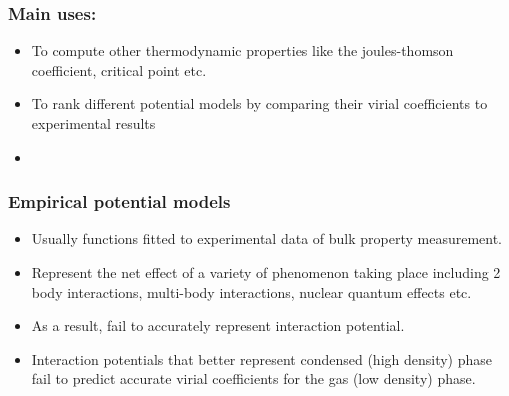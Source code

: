\documentclass[xcolor=svgnames]{beamer}
\begin{document}
		\begin{frame}
            \frametitle{Main uses:}
			\begin{itemize}
				\justifying
				\item To compute other thermodynamic properties like the joules-thomson coefficient, critical point etc.
                \item To rank different potential models by comparing their virial coefficients to experimental results
				\begin{figure}
				\centering
				\end{figure}
            \item {}
			\end{itemize}
		\end{frame}
		
		\begin{frame}
			\frametitle{Empirical potential models}
			\begin{itemize}
				\justifying
				\item Usually functions fitted to experimental data of bulk property measurement.
				\item Represent the net effect of a variety of phenomenon taking place including 2 body interactions, multi-body interactions, nuclear quantum effects etc.
				\item As a result, fail to accurately represent interaction potential.
				\item Interaction potentials that better represent condensed (high density) phase fail to predict accurate virial coefficients for the gas (low density) phase.
			\end{itemize}
		\end{frame}
		
\end{document}

